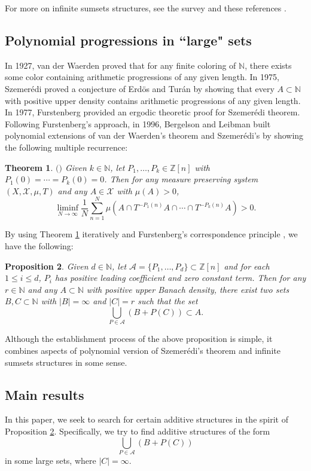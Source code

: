 \documentclass[reqno,12pt]{amsart}
\newtheorem{thm}{Theorem}[section]
\newtheorem{prop}[thm]{Proposition}
\def \N {\mathbb N}
\def \Z {\mathbb Z}
\def \X {\mathcal{X}}
\numberwithin{equation}{section}
\begin{document}
For more on infinite sumsets structures, see the survey \cite{KMRR2025} and these references \cite{MRR,H19,KMRR22a,KMRR22b,KousekRadic2025,Kousek2025a,KMRR2025b,Her2025}.
\subsection{Polynomial progressions in ``large" sets}
In 1927, van der Waerden \cite{VDW} proved that for any finite coloring of $\N$, there exists some color containing arithmetic progressions of any given length. In 1975, Szemer\'edi \cite{S75} proved a conjecture of Erd\"os and Tur\'an by showing that every $A\subset \N$ with positive upper density contains arithmetic progressions of any given length. In 1977, Furstenberg \cite{F77} provided an ergodic theoretic proof for Szemer\'edi theorem. Following Furstenberg’s approach, in 1996, Bergelson and Leibman built polynomial extensions of van der Waerden's theorem and Szemer\'edi's by showing the following multiple recurrence:
\begin{thm}\label{thm1-1}
	$($\cite[Theorem A]{BL96}$)$ Given $k\in \N$, let $P_1,\ldots,P_k\in \Z[n]$ with $P_{1}(0)=\cdots=P_{k}(0)=0$. Then for any measure preserving system $(X,\X,\mu,T)$ and any $A\in \X$ with $\mu(A)>0$, 
	$$\liminf_{N\to\infty}\frac{1}{N}\sum_{n=1}^{N}\mu(A\cap T^{-P_{1}(n)}A\cap \cdots \cap T^{-P_{k}(n)}A)>0.$$ 
\end{thm}
By using Theorem \ref{thm1-1} iteratively and Furstenberg's correspondence principle \cite{F77}, we have the following:
\begin{prop}\label{prop1-1}
	Given $d\in \N$, let $\mathcal{A}=\{P_1,\ldots,P_d\}\subset \Z[n]$ and for each $1\le i\le d$, $P_i$ has positive leading coefficient and zero constant term. Then for any $r\in \N$ and any $A\subset \N$ with positive upper Banach density, there exist two sets $B,C\subset \N$ with $|B|=\infty$ and $|C|=r$ such that the set $$\bigcup_{P\in \mathcal{A}} (B+P(C))\subset A.$$
\end{prop} 
Although the establishment process of the above proposition is simple, it combines aspects of  polynomial version of Szemer\'edi's theorem and infinite sumsets structures in some sense.
\subsection{Main results}
In this paper, we seek to search for certain additive structures in the spirit of Proposition \ref{prop1-1}. Specifically, we try to find additive structures of the form
\begin{equation}\label{eq0}
	\bigcup_{P\in \mathcal{A}} (B+P(C))
\end{equation}
in some large sets, where $|C|=\infty$.
\end{document}
